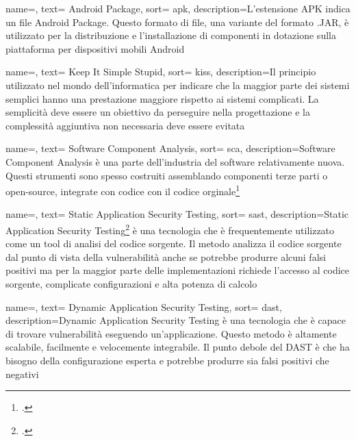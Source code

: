 {
name=,
text= Android Package,
sort= apk,
description={L'estensione APK indica un file Android Package.
Questo formato di file, una variante del formato .JAR, è utilizzato per la distribuzione e l'installazione di componenti in dotazione sulla piattaforma per dispositivi mobili Android}
}

{
name=,
text= Keep It Simple Stupid,
sort= kiss,
description={Il principio utilizzato nel mondo dell'informatica per indicare che la maggior parte dei sistemi semplici hanno una prestazione maggiore rispetto ai sistemi complicati.
La semplicità deve essere un obiettivo da perseguire nella progettazione e la complessità aggiuntiva non necessaria deve essere evitata}
}

{
name=,
text= Software Component Analysis,
sort= sca,
description={Software Component Analysis è una parte dell'industria del software relativamente nuova.
Questi strumenti sono spesso costruiti assemblando componenti terze parti o open-source, integrate con codice con il codice orginale\footcite{site:sca}}
}

{
name=,
text= Static Application Security Testing,
sort= sast,
description={Static Application Security Testing\footcite{site:sast} è una tecnologia che è frequentemente utilizzato come un tool di analisi del codice sorgente.
Il metodo analizza il codice sorgente dal punto di vista della vulnerabilità anche se potrebbe produrre alcuni falsi positivi ma per la maggior parte delle implementazioni richiede l'accesso al codice sorgente, complicate configurazioni e alta potenza di calcolo}
}


{
name=,
text= Dynamic Application Security Testing,
sort= dast,
description={Dynamic Application Security Testing è una tecnologia che è capace di trovare vulnerabilità eseguendo un'applicazione.
Questo metodo è altamente scalabile, facilmente e velocemente integrabile.
Il punto debole del DAST è che ha bisogno della configurazione esperta e potrebbe produrre sia falsi positivi che negativi}
}

